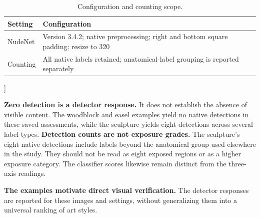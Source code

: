 {\begin{minipage}{\textwidth}
\begin{table}[H]
\centering\normalsize
\renewcommand{\arraystretch}{1.16}
\begin{tabularx}{\linewidth}{@{}lX@{}}
\toprule
Setting & Configuration \\
\midrule
NudeNet & Version 3.4.2; native preprocessing; right and bottom square padding; resize to 320 \\
Counting & All native labels retained; anatomical-label grouping is reported separately \\
\bottomrule
\end{tabularx}
\caption{Configuration and counting scope.}\label{tab:appdetectorconfig}
\end{table}
\end{minipage}}]

\textbf{Zero detection is a detector response.} It does not establish the absence of visible content. The woodblock and easel examples yield no native detections in these saved assessments, while the sculpture yields eight detections across several label types.
\newpage
\textbf{Detection counts are not exposure grades.} The sculpture's eight native detections include labels beyond the anatomical group used elsewhere in the study. They should not be read as eight exposed regions or as a higher exposure category. The classifier scores likewise remain distinct from the three-axis readings.

\textbf{The examples motivate direct visual verification.} The detector responses are reported for these images and settings, without generalizing them into a universal ranking of art styles.

